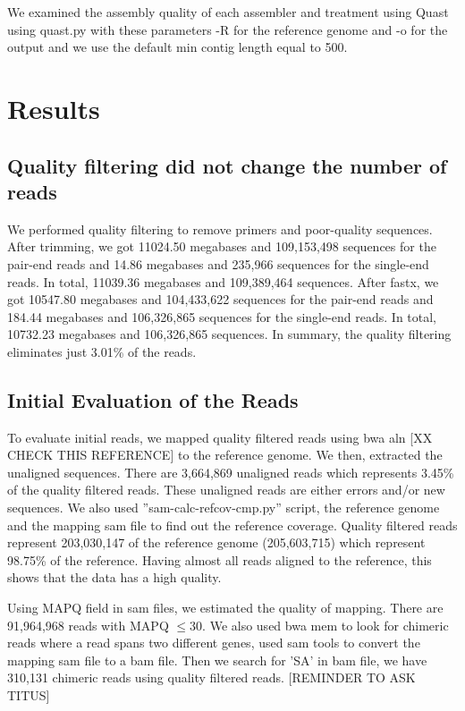 We examined the assembly quality of each assembler and treatment using Quast \cite{quast} using quast.py  with these parameters -R for the reference genome and -o for the output and we use the default min contig length equal to 500. 



\section*{Results}

\subsection*{Quality filtering did not change the number of reads}            
We performed quality filtering to remove primers and poor-quality sequences. After trimming, we got 11024.50 megabases and 109,153,498 sequences for the pair-end reads and 14.86 megabases and 235,966 sequences for the single-end reads. In total,  11039.36 megabases and 109,389,464 sequences. 
After fastx, we got 10547.80 megabases and 104,433,622 sequences for the pair-end reads and 184.44  megabases and 106,326,865 sequences for the single-end reads. In total, 10732.23 megabases and 106,326,865 sequences. 
In summary, the quality filtering eliminates just 3.01\% of the reads. 

\subsection*{Initial Evaluation of the Reads}
To evaluate initial reads, we mapped quality filtered reads using bwa aln \cite{bwa-mem} [XX CHECK THIS REFERENCE] to the reference genome. We then, extracted the unaligned sequences. There are 3,664,869 unaligned reads which represents 3.45\% of the quality filtered reads. These unaligned reads are either errors and/or new sequences.  We also used ”sam-calc-refcov-cmp.py” script, the reference genome and the mapping  sam file to find out the reference coverage. Quality filtered reads  represent 203,030,147  of the reference genome (205,603,715) which represent 98.75\%  of the reference. Having almost all reads aligned to the reference, this shows that the data has a high quality. 

Using MAPQ field in sam files, we estimated the quality of mapping. There are 91,964,968 reads with MAPQ $\leq 30$. 
We also used bwa mem  \cite{bwa-mem} to look for chimeric reads where a read spans two different genes, used sam tools to convert the mapping sam file to a bam file. Then we search for ’SA’ in bam file, we have 310,131 chimeric reads using quality filtered reads. 
[REMINDER TO ASK TITUS]
 



